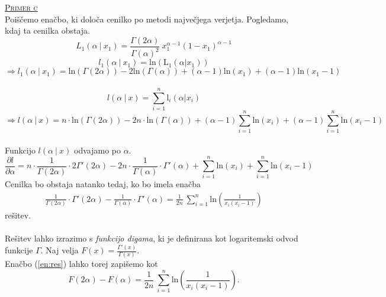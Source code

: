 \documentclass[a4paper,12pt]{article}
\begin{document}
\noindent
\textsc{\underline{Primer c}}
\\
Poiščemo enačbo, ki določa cenilko po metodi največjega verjetja. Pogledamo, kdaj ta cenilka obstaja.
$$ L_1 (\alpha \ | \ x_1) = \frac{\Gamma (2 \alpha)}{\Gamma (\alpha)^2} \ x_1^{\alpha - 1} (1 - x_1)^{\alpha - 1} $$
$$ l_1 (\alpha \ | \ x_1) = \text{ln}(\text{L}_1 (\alpha | x_1)) $$
$$ \Rightarrow l_1 (\alpha \ | \ x_1) = \text{ln}(\Gamma (2 \alpha)) - 2 \text{ln} (\Gamma (\alpha)) + (\alpha - 1) \text{ln}(x_1) + (\alpha - 1) \text{ln}(x_1 - 1) $$
\\
$$ l (\alpha \ | \ x) = \sum_{i = 1}^{n} \text{l}_i (\alpha | x_i) $$
$$ \Rightarrow l (\alpha \ | \ x) = n \cdot \text{ln}(\Gamma (2 \alpha)) - 2 n \cdot \text{ln}(\Gamma (\alpha)) + (\alpha - 1) \sum_{i = 1}^{n} \text{ln}(x_i) + (\alpha - 1) \sum_{i = 1}^{n} \text{ln} (x_i - 1)$$
\\
Funkcijo $ l (\alpha \ | \ x) $ odvajamo po $\alpha$.
$$ \frac{\partial l}{\partial \alpha} = n \cdot \frac{1}{\Gamma (2 \alpha)} \cdot 2 \Gamma' (2 \alpha) - 2n \cdot \frac{1}{\Gamma (\alpha)} \cdot \Gamma' (\alpha) + \sum_{i = 1}^{n} \text{ln}(x_i) + \sum_{i = 1}^{n} \text{ln}(x_i - 1)$$
Cenilka bo obstaja natanko tedaj, ko bo imela enačba
\begin{align}\label{en:res}
    \frac{1}{\Gamma (2 \alpha)} \cdot \Gamma' (2 \alpha) - \frac{1}{\Gamma (\alpha)} \cdot \Gamma' (\alpha) = \frac{1}{2n} \ \sum_{i = 1}^{n} \text{ln} \left( \frac{1}{x_i(x_i - 1)} \right)
\end{align}
rešitev.
\\
\\
Rešitev lahko izrazimo s \textit{funkcijo digama}, ki je definirana kot logaritemski odvod funkcije $\Gamma$. Naj velja  $F(x) = \frac{\Gamma ' (x)}{\Gamma (x)}$.
\\
Enačbo (\ref{en:res}) lahko torej zapišemo kot
$$ F(2 \alpha) - F(\alpha) = \frac{1}{2n} \ \sum_{i = 1}^{n} \text{ln} \left( \frac{1}{x_i(x_i - 1)} \right). $$
\end{document}
